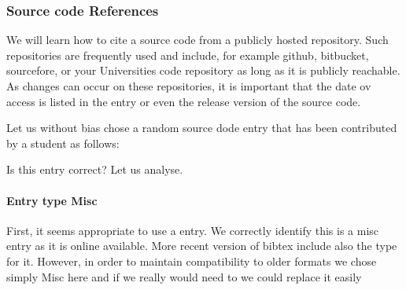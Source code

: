 \subsubsection{Source code References}
\label{\detokenize{lesson/doc/bibtex:source-code-references}}
We will learn how to cite a source code from a publicly hosted
repository. Such repositories are frequently used and include, for
example github, bitbucket, sourcefore, or your Universities code
repository as long as it is publicly reachable.  As changes can occur
on these repositories, it is important that the date ov access is
listed in the entry or even the release version of the source code.

Let us without bias chose a random source dode entry that has been
contributed by a student as follows:

\begin{sphinxVerbatim}[commandchars=\\\{\}]
         
           
     
         
           
          
           
           
\end{sphinxVerbatim}

Is this entry correct? Let us analyse.


\paragraph{Entry type Misc}
\label{\detokenize{lesson/doc/bibtex:entry-type-misc}}
First, it seems appropriate to use a  entry.  We correctly
identify this is a misc entry as it is online available. More recent
version of bibtex include also the type  for it. However, in
order to maintain compatibility to older formats we chose simply Misc
here and if we really would need to we could replace it easily


